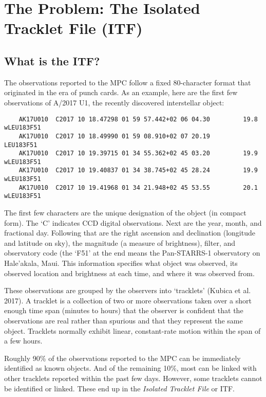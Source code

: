 \documentclass[11pt,letter]{article}
\begin{document}
\section*{The Problem: The Isolated Tracklet File (ITF)}
\subsection*{What is the ITF?}
The observations reported to the MPC follow a fixed 80-character format that originated in the era of punch cards.  As an example, here are the first few observations of A/2017 U1, the recently discovered interstellar object:

\begin{verbatim}
    AK17U010  C2017 10 18.47298 01 59 57.442+02 06 04.30         19.8 wLEU183F51
    AK17U010  C2017 10 18.49990 01 59 08.910+02 07 20.19               LEU183F51
    AK17U010  C2017 10 19.39715 01 34 55.362+02 45 03.20         19.9 wLEU183F51
    AK17U010  C2017 10 19.40837 01 34 38.745+02 45 28.24         19.9 wLEU183F51
    AK17U010  C2017 10 19.41968 01 34 21.948+02 45 53.55         20.1 wLEU183F51
\end{verbatim}

The first few characters are the unique designation of the object (in compact form).  The `C' indicates CCD digital observations.  Next are the year, month, and fractional day.  Following that are the right ascension and declination (longitude and latitude on sky), the magnitude (a measure of brightness), filter, and observatory code (the `F51' at the end means the Pan-STARRS-1 observatory on Hale'akala, Maui.  This information specifies what object was observed, its observed location and brightness at each time, and where it was observed from.  

These observations are grouped by the observers into `tracklets' (Kubica et al. 2017).  A tracklet is a collection of two or more observations taken over a short enough time span (minutes to hours) that the observer is confident that the observations are real rather than spurious and that they represent the same object.  Tracklets normally exhibit linear, constant-rate motion within the span of a few hours.

Roughly 90\% of the observations reported to the MPC can be immediately identified as known objects.  And of the remaining 10\%, most can be linked with other tracklets reported within the past few days.  However, some tracklets cannot be identified or linked.  These end up in the {\it Isolated Tracklet File} or ITF.
\end{document}
